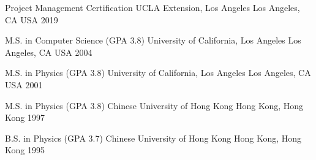 

\begin{cventries}


 \cventry
    {Project Management Certification} %
    {UCLA Extension, Los Angeles} %
    {Los Angeles, CA USA} %
    {2019} %
    {}


  \cventry
    {M.S. in Computer Science (GPA 3.8)} %
    {University of California, Los Angeles} %
    {Los Angeles, CA USA} %
    {2004} %
    {}

	\cventry
    {M.S. in Physics (GPA 3.8)} %
    {University of California, Los Angeles} %
    {Los Angeles, CA USA} %
    {2001} %
    {}	
	
	\cventry
    {M.S. in Physics (GPA 3.8)} %
    {Chinese University of Hong Kong} %
    {Hong Kong, Hong Kong} %
    {1997} %
    {}	

	\cventry
    {B.S. in Physics (GPA 3.7)} %
    {Chinese University of Hong Kong} %
    {Hong Kong, Hong Kong} %
    {1995} %
    {}	

\end{cventries}
